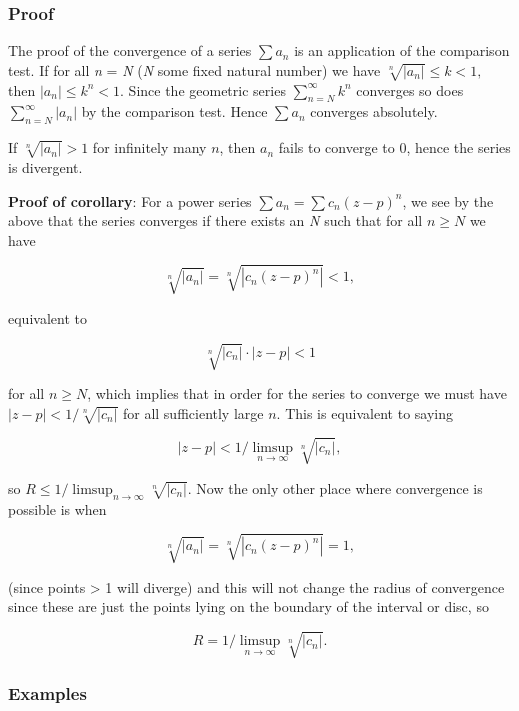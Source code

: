 \subsubsection{Proof}
\label{sss:proo-028d}


The proof of the convergence of a series $\sum a_n$ is an application of the comparison test. If for all \textit{n} = \textit{N} (\textit{N} some fixed natural number) we have $\sqrt[n]{|a_n|} \le k < 1,$ then $|a_n| \le k^n < 1$. Since the geometric series $\sum _{n=N}^\infty k^n$ converges so does $\sum _{n=N}^\infty |a_n|$ by the comparison test. Hence $\sum a_n$ converges absolutely.


If $\sqrt[n]{|a_n|} > 1$ for infinitely many $n$, then $a_n$ fails to converge to 0, hence the series is divergent.


\textbf{Proof of corollary}: For a power series $\sum a_n = \sum c_n (z - p)^n$, we see by the above that the series converges if there exists an \textit{N} such that for all $n \geq N$ we have


\[
\sqrt[n]{|a_n|} = \sqrt[n]{|c_n(z - p)^n|} < 1,
\]


equivalent to


\[
\sqrt[n]{|c_n|}\cdot|z - p| < 1
\]


for all $n \geq N$, which implies that in order for the series to converge we must have $|z - p| < 1/\sqrt[n]{|c_n|}$ for all sufficiently large $n$. This is equivalent to saying


\[
|z - p| < 1/\limsup _{n \rightarrow \infty}{\sqrt[n]{|c_n|}},
\]


so $R \le 1/\limsup _{n \rightarrow \infty}{\sqrt[n]{|c_n|}}.$ Now the only other place where convergence is possible is when


\[
\sqrt[n]{|a_n|} = \sqrt[n]{|c_n(z - p)^n|} = 1,
\]


(since points > 1 will diverge) and this will not change the radius of convergence since these are just the points lying on the boundary of the interval or disc, so


\[
R = 1/\limsup _{n \rightarrow \infty}{\sqrt[n]{|c_n|}}.
\]


\subsubsection{Examples}
\label{sss:exam-bfeb}

